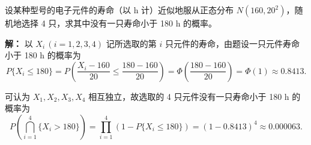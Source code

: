 \documentclass[twoside]{article}
\begin{document}
设某种型号的电子元件的寿命（以 h 计）近似地服从正态分布 $N(160, 20^2)$，随机地选择 4 只，求其中没有一只寿命小于 180 h 的概率。

\textbf{解：} 以 $X_i\,(i = 1,2,3,4)$ 记所选取的第 $i$ 只元件的寿命，由题设一只元件寿命小于 180 h 的概率为
\[
P\{X_i \leq 180\} = P\left(\frac{X_i - 160}{20} \leq \frac{180 - 160}{20}\right) = \Phi\left(\frac{180 - 160}{20}\right) = \Phi(1) \approx 0.8413.
\]

\begin{ans}{30}{30}
可认为 $X_1, X_2, X_3, X_4$ 相互独立，故选取的 4 只元件没有一只寿命小于 180 h 的概率为
\[
P\left(\bigcap_{i=1}^{4} \{X_i > 180\}\right) = \prod_{i=1}^{4} (1 - P\{X_i \leq 180\}) = (1 - 0.8413)^4 \approx 0.000063.
\]
\end{ans}
\end{document}
